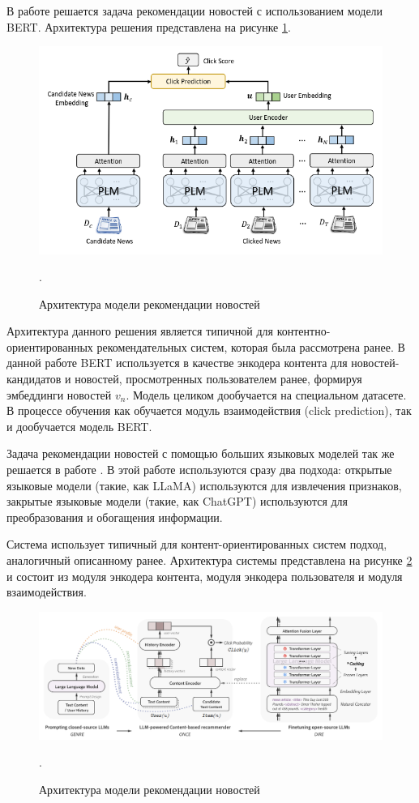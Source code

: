 В работе \cite{news_rec_bert} решается задача рекомендации новостей с использованием модели BERT. Архитектура решения представлена  на рисунке \ref{img:news_rec_bert}.

\begin{figure}[h]
    \centering
    \includegraphics[width=\linewidth]{../images/news_rec_bert.png}
    \caption{Архитектура модели рекомендации новостей \cite{news_rec_bert}}.
    \label{img:news_rec_bert}
\end{figure}

Архитектура данного решения является типичной для контентно-ориентированных рекомендательных систем, которая была рассмотрена ранее. В данной работе BERT используется в качестве энкодера контента для новостей-кандидатов и новостей, просмотренных пользователем ранее, формируя эмбеддинги новостей $v_n$. Модель целиком дообучается на специальном датасете. В процессе обучения как обучается модуль взаимодействия (click prediction), так и дообучается модель BERT.

Задача рекомендации новостей с помощью больших языковых моделей так же решается в работе \cite{news_rec_gen}. В этой работе используются сразу два подхода: открытые языковые модели (такие, как LLaMA) используются для извлечения признаков, закрытые языковые модели (такие, как ChatGPT) используются для преобразования и обогащения информации.

Система использует типичный для контент-ориентированных систем подход, аналогичный описанному ранее. Архитектура системы представлена на рисунке \ref{img:news_rec_gen} и состоит из модуля энкодера контента, модуля энкодера пользователя и модуля взаимодействия.

\begin{figure}[h]
    \centering
    \includegraphics[width=\linewidth]{../images/news_rec_gen.png}
    \caption{Архитектура модели рекомендации новостей \cite{news_rec_gen}}.
    \label{img:news_rec_gen}
\end{figure}

